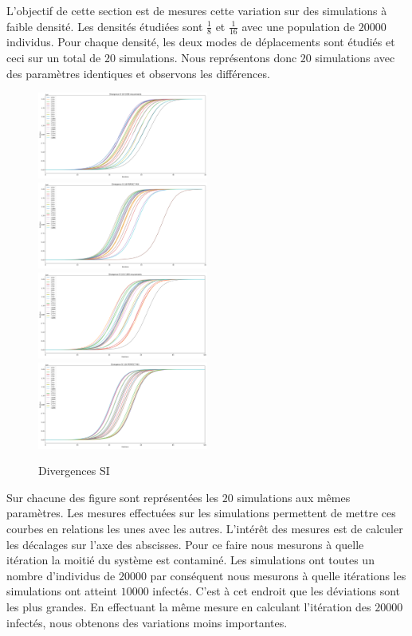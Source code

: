 L'objectif de cette section est de mesures cette variation sur des simulations à faible densité. Les densités étudiées sont $\frac{1}{8}$ et $\frac{1}{16}$ avec une population de $20000$ individus. Pour chaque densité, les deux modes de déplacements sont étudiés et ceci sur un total de $20$ simulations. Nous représentons donc $20$ simulations avec des paramètres identiques et observons les différences.

\newpage

\begin{figure}
    \centering
    \captionsetup{justification=centering}
    \includegraphics[width=0.5\textwidth]{Images/SI_divergence_8_1000.png}
    \includegraphics[width=0.5\textwidth]{Images/SI_divergence_8_mix.png}
    \includegraphics[width=0.5\textwidth]{Images/SI_divergence_16_1000.png}
    \includegraphics[width=0.5\textwidth]{Images/SI_divergence_16_mix.png}
    \caption{Divergences SI}
\end{figure}

Sur chacune des figure sont représentées les $20$ simulations aux mêmes paramètres. Les mesures effectuées sur les simulations permettent de mettre ces courbes en relations les unes avec les autres. L'intérêt des mesures est de calculer les décalages sur l'axe des abscisses. Pour ce faire nous mesurons à quelle itération la moitié du système est contaminé. Les simulations ont toutes un nombre d'individus de $20000$ par conséquent nous mesurons à quelle itérations les simulations ont atteint $10000$ infectés. C'est à cet endroit que les déviations sont les plus grandes. En effectuant la même mesure en calculant l'itération des $20000$ infectés, nous obtenons des variations moins importantes.\\

